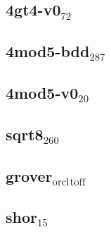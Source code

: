 \documentclass[11pt]{article}
\begin{document}
\subsection{4gt4-v0\(_{\text{72}}\)}
\label{sec:org1451c28}

\subsection{4mod5-bdd\(_{\text{287}}\)}
\label{sec:orgc6072e7}

\subsection{4mod5-v0\(_{\text{20}}\)}
\label{sec:orge260654}

\subsection{sqrt8\(_{\text{260}}\)}
\label{sec:orgf461109}

\subsection{grover\(_{\text{orcl}}\)\(_{\text{toff}}\)}
\label{sec:orgabecdca}

\subsection{shor\(_{\text{15}}\)}
\label{sec:org3ba8c5a}
\end{document}
